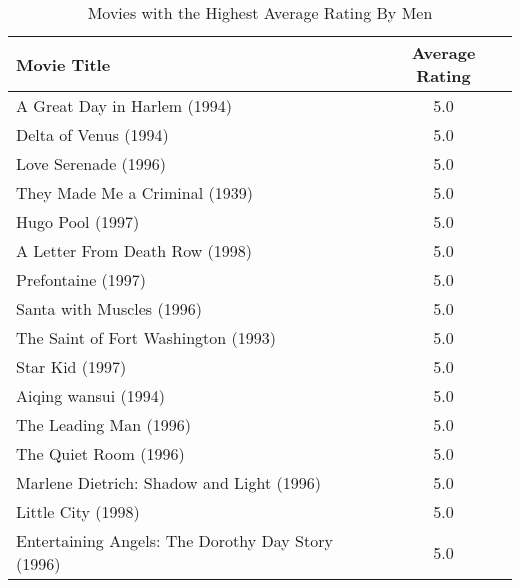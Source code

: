 \documentclass{article}
\begin{document}
\begin{table}[!h]
\centering
\begin{tabular}{l c}
Movie Title & Average Rating \\
\hline
A Great Day in Harlem (1994) & 5.0 \\
Delta of Venus (1994) & 5.0 \\
Love Serenade (1996) & 5.0 \\
They Made Me a Criminal (1939) & 5.0 \\
Hugo Pool (1997) & 5.0 \\
A Letter From Death Row (1998) & 5.0 \\
Prefontaine (1997) & 5.0 \\
Santa with Muscles (1996) & 5.0 \\
The Saint of Fort Washington (1993) & 5.0 \\
Star Kid (1997) & 5.0 \\
Aiqing wansui (1994) & 5.0 \\
The Leading Man (1996) & 5.0 \\
The Quiet Room (1996) & 5.0 \\
Marlene Dietrich: Shadow and Light (1996)  & 5.0 \\
Little City (1998) & 5.0 \\
Entertaining Angels: The Dorothy Day Story (1996) & 5.0 \\
\hline
\end{tabular}
\caption{Movies with the Highest Average Rating By Men}
\end{table}
\end{document}
